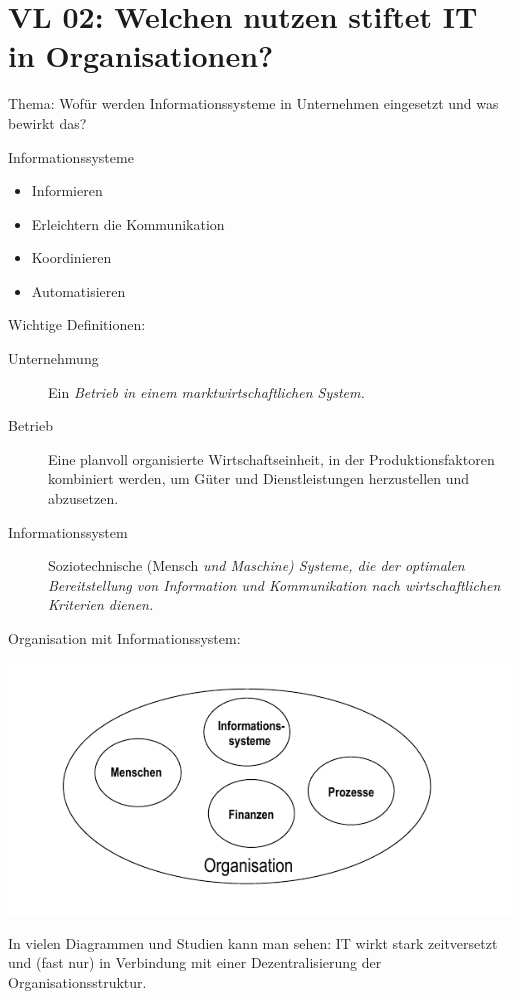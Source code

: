 \section{VL 02: Welchen nutzen stiftet IT in Organisationen?}
Thema: Wofür werden Informationssysteme in Unternehmen eingesetzt und was bewirkt das?

Informationssysteme
\begin{itemize}
	\item Informieren
	\item Erleichtern die Kommunikation
	\item Koordinieren
	\item Automatisieren
\end{itemize}

Wichtige Definitionen:
\begin{description}
	\item[Unternehmung] Ein \em Betrieb \em in einem marktwirtschaftlichen System.
	\item[Betrieb] Eine planvoll organisierte Wirtschaftseinheit, in der Produktionsfaktoren kombiniert werden, um Güter und Dienstleistungen herzustellen und abzusetzen.
	\item[Informationssystem] Soziotechnische (Mensch \em und \em Maschine) Systeme, die der optimalen Bereitstellung von Information und Kommunikation nach wirtschaftlichen Kriterien dienen.
\end{description}

Organisation mit Informationssystem:
\begin{center}\includegraphics[width=1\textwidth]{IS-Kontext.png}\end{center}

In vielen Diagrammen und Studien kann man sehen: IT wirkt stark zeitversetzt und (fast nur) in Verbindung mit einer Dezentralisierung der Organisationsstruktur.

